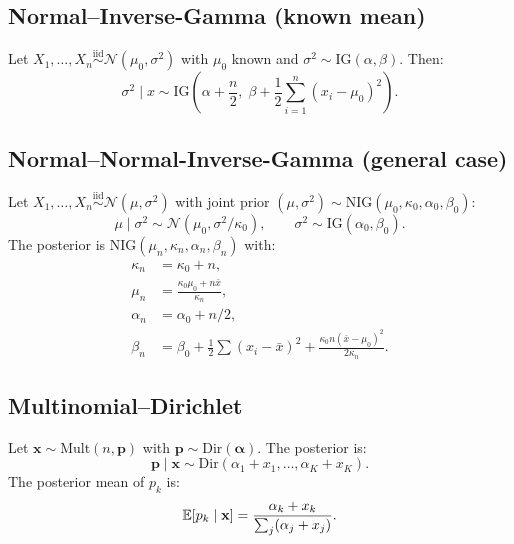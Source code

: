 \subsection{Normal--Inverse-Gamma (known mean)}

\begin{theorem}
Let $X_1, \ldots, X_n \overset{\text{iid}}{\sim} \mathcal{N}(\mu_0, \sigma^2)$
with $\mu_0$ known and $\sigma^2 \sim \text{IG}(\alpha, \beta)$. Then:
\[
  \sigma^2 \mid x \sim \text{IG}\!\left(\alpha + \frac{n}{2},\;
  \beta + \frac{1}{2}\sum_{i=1}^n (x_i - \mu_0)^2\right).
\]
\end{theorem}

\subsection{Normal--Normal-Inverse-Gamma (general case)}

\begin{theorem}
Let $X_1, \ldots, X_n \overset{\text{iid}}{\sim} \mathcal{N}(\mu, \sigma^2)$
with joint prior $(\mu, \sigma^2) \sim \text{NIG}(\mu_0, \kappa_0, \alpha_0, \beta_0)$:
\[
  \mu \mid \sigma^2 \sim \mathcal{N}(\mu_0, \sigma^2/\kappa_0), \qquad
  \sigma^2 \sim \text{IG}(\alpha_0, \beta_0).
\]
The posterior is $\text{NIG}(\mu_n, \kappa_n, \alpha_n, \beta_n)$ with:
\begin{align*}
  \kappa_n &= \kappa_0 + n, \\
  \mu_n &= \frac{\kappa_0 \mu_0 + n\bar{x}}{\kappa_n}, \\
  \alpha_n &= \alpha_0 + n/2, \\
  \beta_n &= \beta_0 + \tfrac{1}{2}\sum(x_i-\bar{x})^2
  + \frac{\kappa_0 n(\bar{x}-\mu_0)^2}{2\kappa_n}.
\end{align*}
\end{theorem}

\subsection{Multinomial--Dirichlet}

\begin{example}
Let $\mathbf{x} \sim \text{Mult}(n, \mathbf{p})$ with
$\mathbf{p} \sim \text{Dir}(\boldsymbol{\alpha})$. The posterior is:
\[
  \mathbf{p} \mid \mathbf{x} \sim \text{Dir}(\alpha_1 + x_1, \ldots, \alpha_K + x_K).
\]
The posterior mean of $p_k$ is:
\[
  \mathbb{E}[p_k \mid \mathbf{x}] = \frac{\alpha_k + x_k}{\sum_j (\alpha_j + x_j)}.
\]
\end{example}

